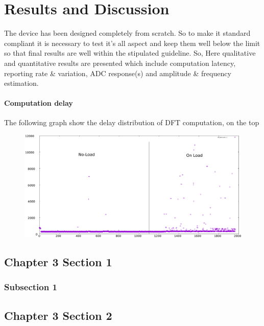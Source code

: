 \chapter{Results and Discussion}
The device has been designed completely from scratch. So to make it standard compliant it is necessary to test it's all aspect and keep them well below the limit so that final results are well within the stipulated guideline. So, Here qualitative and quantitative results are presented which include computation latency, reporting rate \& variation, ADC response(s) and amplitude \& frequency estimation.

\subsubsection{Computation delay}
The following graph show the delay distribution of DFT computation, on the top 
\begin{figure}[h]
	\includegraphics[scale=0.23]{fig/delay_test.eps}
\end{figure}

\section{Chapter 3 Section 1}
\subsection{Subsection 1}
\section{Chapter 3 Section 2}